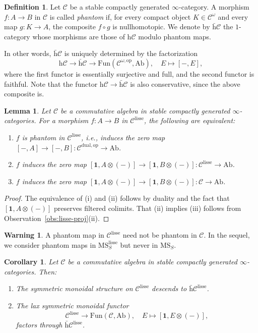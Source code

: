 \documentclass{amsart}
\numberwithin{equation}{section}
\theoremstyle{plain}
\newtheorem{lemma}[equation]{Lemma}
\newtheorem{corollary}[equation]{Corollary}
\theoremstyle{definition}
\newtheorem{definition}[equation]{Definition}
\newtheorem{warning}[equation]{Warning}
\let\scr=\mathcal
\def\1{\mathbf 1}
\def\h{\mathrm h}
\def\ph{\mathord-}
\def\op{\mathrm{op}}
\def\MS{\mathrm{MS}}
\def\Ab{\mathrm{A}\mathrm{b}}
\def\Fun{\mathrm{Fun}}
\def\w{\bar{\mathrm{h}}}
\def\lisse{\mathrm{lisse}}
\begin{document}
\begin{definition}
	Let $\scr C$ be a stable compactly generated $\infty$-category. A morphism $f\colon A\to B$ in $\scr C$ is called \emph{phantom} if, for every compact object $K\in \scr C^\omega$ and every map $g\colon K\to A$, the composite $f\circ g$ is nullhomotopic. We denote by $\w\scr C$ the $1$-category whose morphisms are those of $\h\scr C$ modulo phantom maps.
\end{definition} 

In other words, $\w\scr C$ is uniquely determined by the factorization
\[
\h\scr C\to\w\scr C\to \Fun(\scr C^{\omega,\op},\Ab),\quad E\mapsto [\ph,E],
\]
where the first functor is essentially surjective and full, and the second functor is faithful.
Note that the functor $\h\scr C\to\w\scr C$ is also conservative, since the above composite is. 

\begin{lemma}\label{lem:phantom}
	Let $\scr C$ be a commutative algebra in stable compactly generated $\infty$-categories. For a morphism $f\colon A\to B$ in $\scr C^\lisse$, the following are equivalent:
	\begin{enumerate}
		\item $f$ is phantom in $\scr C^\lisse$, i.e., induces the zero map $[\ph,A]\to[\ph,B]\colon \scr C^{\mathrm{dual},\op}\to\Ab$.
		\item $f$ induces the zero map $[\1,A\otimes(\ph)]\to [\1,B\otimes(\ph)]\colon \scr C^\lisse\to \Ab$.
		\item $f$ induces the zero map $[\1,A\otimes(\ph)]\to [\1,B\otimes(\ph)]\colon \scr C\to \Ab$.
	\end{enumerate}
\end{lemma}

\begin{proof}
	The equivalence of (i) and (ii) follows by duality and the fact that $[\1,A\otimes(\ph)]$ preserves filtered colimits. 
	That (ii) implies (iii) follows from Observation~\ref{obs:lisse-proj}(ii).
\end{proof}

\begin{warning}
	A phantom map in $\scr C^\lisse$ need not be phantom in $\scr C$. In the sequel, we consider phantom maps in $\MS_S^\lisse$ but never in $\MS_S$.
\end{warning}

\begin{corollary}\label{cor:phantom}
	Let $\scr C$ be a commutative algebra in stable compactly generated $\infty$-categories. Then:
	\begin{enumerate}
		\item The symmetric monoidal structure on $\scr C^\lisse$ descends to $\w\scr C^\lisse$.
		\item The lax symmetric monoidal functor 
		\[
		\scr C^\lisse\to \Fun(\scr C,\Ab),\quad E\mapsto [\1,E\otimes(\ph)],
		\]
		factors through $\w\scr C^\lisse$.
	\end{enumerate}
\end{corollary}
\end{document}
